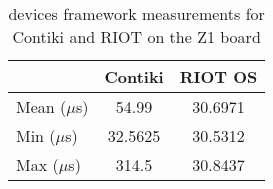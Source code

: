 \begin{table}[!ht]
  \centering
  \begin{tabular}{l|c|c}
                & Contiki  & RIOT OS \\ \hline
  Mean ($\mu$s) & 54.99    & 30.6971 \\
  Min  ($\mu$s) & 32.5625  & 30.5312 \\
  Max  ($\mu$s) & 314.5    & 30.8437
  \end{tabular}
  \caption{devices framework measurements for Contiki and RIOT on the Z1 board}
  \label{tab:devices-framework-z1}
  \end{table}